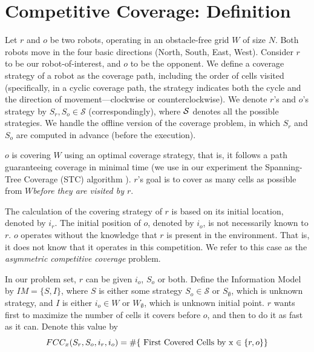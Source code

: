 \documentclass[a4paper,10pt]{article}
\newcommand\rob{\ensuremath{r}\xspace}
\newcommand\opp{\ensuremath{o}\xspace}
\newcommand{\w}{\ensuremath{W}\xspace}
\newcommand{\fcc}{\ensuremath{FCC}\xspace}
\begin{document}

\section{Competitive Coverage: Definition}
Let \rob and \opp be two robots, operating in an obstacle-free grid \w of size $N$. Both robots move in the four basic directions (North, South, East, West). Consider \rob to be our robot-of-interest, and \opp to be the opponent. 
We define a coverage strategy of a robot as the coverage path, including the order of cells visited (specifically, in a cyclic coverage path, the strategy indicates both the cycle and the direction of movement---clockwise or counterclockwise). We denote \rob's and \opp's strategy by $S_{\rob},S_{\opp}\in \mathcal{S}$ (correspondingly), where $\cal{S}$ denotes all the possible strategies. We handle the offline version of the coverage problem, in which $S_{\rob}$ and $S_{\opp}$ are computed in advance (before the execution). 

\opp is covering \w using an optimal coverage strategy, that is, it follows a path guaranteeing coverage in minimal time (we use in our experiment the Spanning-Tree Coverage (STC) algorithm \cite{gabriely2001spanning}). \rob's goal is to cover as many cells as possible from \w {\em before they are visited by \rob}. 


The calculation of the covering strategy of \rob is based on its initial location, denoted by $i_r$. The initial position of \opp, denoted by $i_{\opp}$, is not necessarily known to \rob.
\opp operates without the knowledge that \rob is present in the environment. That is, it does not know that it operates in this competition. We refer to this case as the {\em asymmetric competitive coverage} problem. %

In our problem set, \rob can be given $i_{\opp}$, $S_{\opp}$ or both. Define the Information Model by $IM=\lbrace S,I\rbrace$, where $S$ is either some strategy $S_{\opp}\in \mathcal{S}$ or $S_\emptyset$, which is unknown strategy, and $I$ is either $i_{\opp}\in W$ or $\w_{\emptyset}$, which is unknown initial point. \rob wants first to maximize the number of cells it covers before \opp, and then to do it as fast as it can. Denote this value by  
\[
\fcc_{x}(S_{\rob}, S_{\opp}, i_{\rob}, i_{\opp} )= 
\# \lbrace \textnormal{ First Covered Cells by x $\in \lbrace\rob,\opp\rbrace$} \rbrace 
\]
\end{document}
